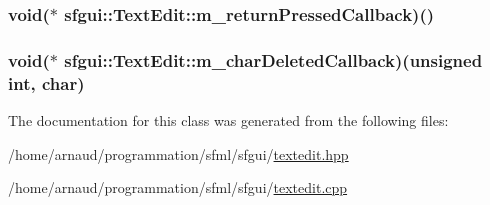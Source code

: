 \hypertarget{classsfgui_1_1TextEdit_d86f9eaadf1313214631b2de009abf55}{
\subsubsection[m\_\-returnPressedCallback]{\setlength{\rightskip}{0pt plus 5cm}void($\ast$ {\bf sfgui::TextEdit::m\_\-returnPressedCallback})()}}
\label{classsfgui_1_1TextEdit_d86f9eaadf1313214631b2de009abf55}


\hypertarget{classsfgui_1_1TextEdit_1538508447c54b9f997fc8a68eb5c097}{
\subsubsection[m\_\-charDeletedCallback]{\setlength{\rightskip}{0pt plus 5cm}void($\ast$ {\bf sfgui::TextEdit::m\_\-charDeletedCallback})(unsigned int, char)}}
\label{classsfgui_1_1TextEdit_1538508447c54b9f997fc8a68eb5c097}




The documentation for this class was generated from the following files:\begin{CompactItemize}
\item 
/home/arnaud/programmation/sfml/sfgui/\hyperlink{textedit_8hpp}{textedit.hpp}\item 
/home/arnaud/programmation/sfml/sfgui/\hyperlink{textedit_8cpp}{textedit.cpp}\end{CompactItemize}
